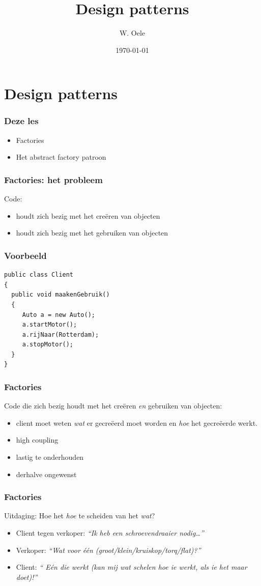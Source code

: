 \documentclass{beamer}
\title{Design patterns}
\author{W. Oele}
\date{\today}
\begin{document}
\frame{\titlepage}

\section{Design patterns}

\begin{frame}
\frametitle{Deze les}
\begin{itemize}
\item Factories
\item Het abstract factory patroon
\end{itemize}
\end{frame}


\begin{frame}
\frametitle{Factories: het probleem}
Code:
\begin{itemize}
\item houdt zich bezig met het cre\"eren van objecten
\item houdt zich bezig met het gebruiken van objecten
\end{itemize}
\end{frame}


\begin{frame}[fragile]
\frametitle{Voorbeeld}
\begin{verbatim}
public class Client
{
  public void maakenGebruik()
  {
     Auto a = new Auto();
     a.startMotor();
     a.rijNaar(Rotterdam);
     a.stopMotor();
  }
}
\end{verbatim}
\end{frame}


\begin{frame}
\frametitle{Factories}
Code die zich bezig houdt met het cre\"eren \emph{en} gebruiken van objecten:\pause
\begin{itemize}
\item client moet weten \emph{wat} er gecre\"eerd moet worden en \emph{hoe} het gecre\"eerde werkt.
\item high coupling
\item lastig te onderhouden
\item derhalve ongewenst
\end{itemize}
\end{frame}

\begin{frame}
\frametitle{Factories}
Uitdaging: Hoe het \emph{hoe} te scheiden van het \emph{wat}?\pause
\begin{itemize}
\item Client tegen verkoper: \emph{``Ik heb een schroevendraaier nodig\ldots''}
\item Verkoper: \emph{``Wat voor \'e\'en (groot/klein/kruiskop/torq/flat)?''}
\item Client: \emph{`` E\'en die werkt (kan mij wat schelen hoe ie werkt, als ie het maar doet)!'' }
\end{itemize}
\end{frame}
\end{document}
